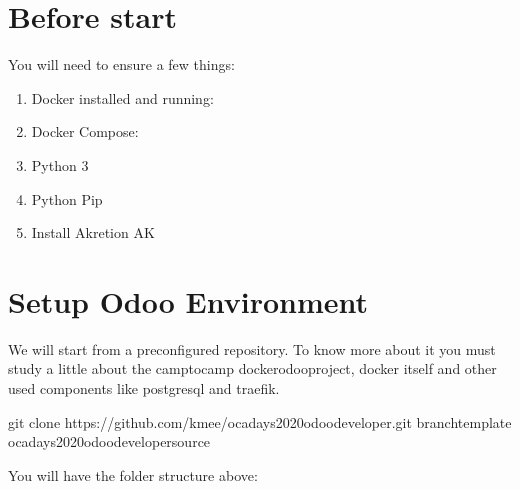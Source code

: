 \documentclass[letterpaper,10pt,english]{sphinxmanual}
\begin{document}
\section{Before start}
\label{\detokenize{technical:before-start}}
You will need to ensure a few things:
\begin{enumerate}
%
\item {} 
Docker installed and running: 

\item {} 
Docker Compose: 

\item {} 
Python 3

\item {} 
Python Pip 

\item {} 
Install Akretion AK

\end{enumerate}


\section{Setup Odoo Environment}
\label{\detokenize{technical:setup-odoo-environment}}
We will start from a pre\sphinxhyphen{}configured repository. To know more about it you must study a
little about the camptocamp docker\sphinxhyphen{}odoo\sphinxhyphen{}project, docker itself and other used components
like postgresql and traefik.

\begin{sphinxVerbatim}[commandchars=\\\{\}]
git clone https://github.com/kmee/oca\PYGZhy{}days\PYGZhy{}2020\PYGZhy{}odoo\PYGZhy{}developer.git \PYGZhy{}\PYGZhy{}branchtemplate
 oca\PYGZhy{}days\PYGZhy{}2020\PYGZhy{}odoo\PYGZhy{}developer\PYGZhy{}source
\end{sphinxVerbatim}

You will have the folder structure above:
\end{document}
